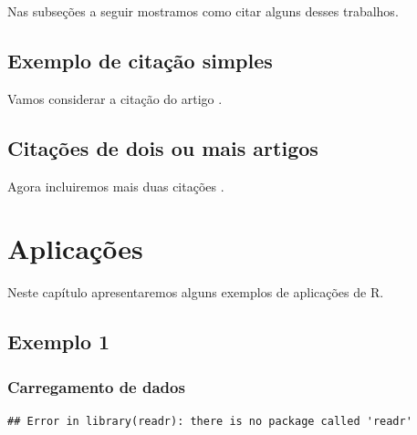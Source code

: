 \documentclass[
  oneside]{book}
\newenvironment{Shaded}{\begin{snugshade}}{\end{snugshade}}
\newcommand{\CommentTok}[1]{\textcolor[rgb]{0.56,0.35,0.01}{\textit{#1}}}
\newcommand{\KeywordTok}[1]{\textcolor[rgb]{0.13,0.29,0.53}{\textbf{#1}}}
\newcommand{\NormalTok}[1]{#1}
\begin{document}
Nas subseções a seguir mostramos como citar alguns desses trabalhos.

\hypertarget{exemplo-de-citauxe7uxe3o-simples}{%
\section{Exemplo de citação simples}\label{exemplo-de-citauxe7uxe3o-simples}}

Vamos considerar a citação do artigo \citep{Partanen2016}.

\hypertarget{citauxe7uxf5es-de-dois-ou-mais-artigos}{%
\section{Citações de dois ou mais artigos}\label{citauxe7uxf5es-de-dois-ou-mais-artigos}}

Agora incluiremos mais duas citações \citep[\citet{Williams2020}]{DaSilvaEloy2017}.

\hypertarget{aplicauxe7uxf5es}{%
\chapter{Aplicações}\label{aplicauxe7uxf5es}}

Neste capítulo apresentaremos alguns exemplos de
aplicações de R.

\hypertarget{exemplo-1}{%
\section{Exemplo 1}\label{exemplo-1}}

\hypertarget{carregamento-de-dados}{%
\subsection{Carregamento de dados}\label{carregamento-de-dados}}

\begin{Shaded}
\end{Shaded}

\begin{verbatim}
## Error in library(readr): there is no package called 'readr'
\end{verbatim}
\end{document}
